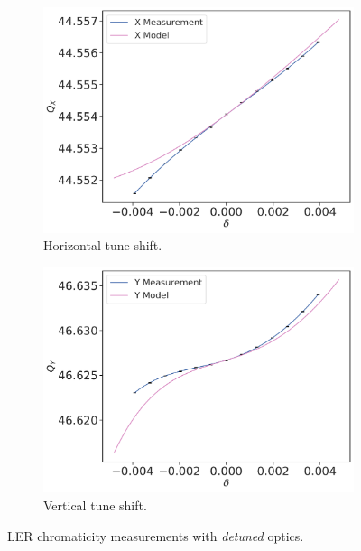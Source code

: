 \begin{figure}[!htb]
    \centering
    \begin{subfigure}[b]{0.49\textwidth}
        \includegraphics[width=\linewidth]{images/kek/chromaticity/LER_09/qx_modelq0q1.pdf}
        \caption{Horizontal tune shift.}
    \end{subfigure}
    \begin{subfigure}[b]{0.49\textwidth}
        \includegraphics[width=\linewidth]{images/kek/chromaticity/LER_09/qy_modelq0q1.pdf}
        \caption{Vertical tune shift.}
    \end{subfigure}
    \caption{LER chromaticity measurements with \textit{detuned} optics.}
    \label{fig:kek:chroma_LER_detuned}
\end{figure}

